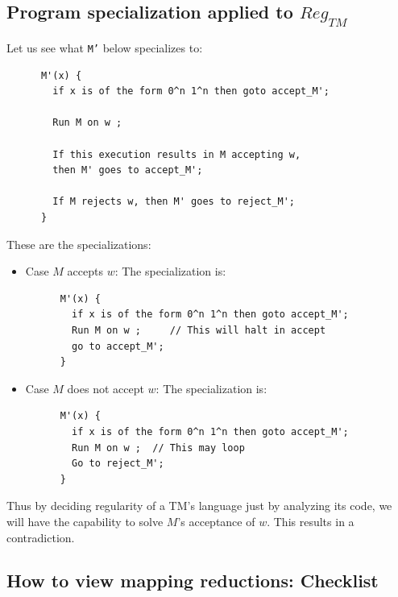 \documentclass[10pt]{article}
\begin{document}
\subsection{Program specialization applied to $Reg_{TM}$}

\noindent Let us see what {\tt M'} below specializes to:
\begin{verbatim}
      M'(x) {
        if x is of the form 0^n 1^n then goto accept_M';

        Run M on w ; 

        If this execution results in M accepting w,
        then M' goes to accept_M';

        If M rejects w, then M' goes to reject_M';
      }
\end{verbatim}


\noindent These are the specializations:
\begin{itemize}
\item Case $M$ accepts $w$: The specialization is:  

\begin{verbatim}
      M'(x) {
        if x is of the form 0^n 1^n then goto accept_M';
        Run M on w ;     // This will halt in accept
        go to accept_M'; 
      }
\end{verbatim}


  
\item Case $M$ does not accept $w$: The specialization is:  

\begin{verbatim}
      M'(x) {
        if x is of the form 0^n 1^n then goto accept_M';
        Run M on w ;  // This may loop
        Go to reject_M';
      }
\end{verbatim}


  
\end{itemize}

\noindent Thus by deciding regularity of a TM's language just by
analyzing its code, we will have the capability to solve $M$'s acceptance
of $w$. This results in a contradiction.



\subsection{How to view mapping reductions: Checklist}
\end{document}

